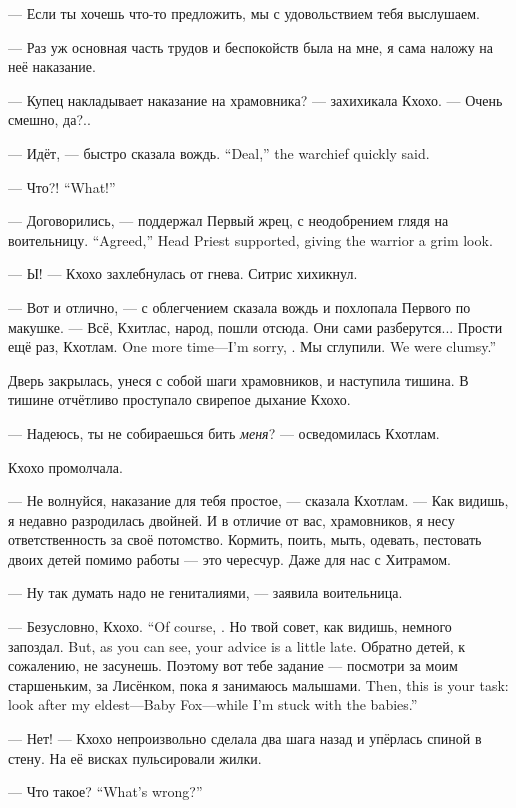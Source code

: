 --- Если ты хочешь что-то предложить, мы с удовольствием тебя выслушаем.

--- Раз уж основная часть трудов и беспокойств была на мне, я сама наложу на неё наказание.

--- Купец накладывает наказание на храмовника? --- захихикала Кхохо.
--- Очень смешно, да?..

{--- Идёт, --- быстро сказала вождь.}
{``Deal,'' the warchief quickly said.}

{--- Что?!}
{``What!''}

{--- Договорились, --- поддержал Первый жрец, с неодобрением глядя на воительницу.}
{``Agreed,'' Head Priest supported, giving the warrior a grim look.}

--- Ы! --- Кхохо захлебнулась от гнева.
Ситрис хихикнул.

--- Вот и отлично, --- с облегчением сказала вождь и похлопала Первого по макушке.
--- Всё, Кхитлас, народ, пошли отсюда.
Они сами разберутся...
{Прости ещё раз, Кхотлам.}
{One more time---I'm sorry, \Kchotlam.}
{Мы сглупили.}
{We were clumsy.''}

Дверь закрылась, унеся с собой шаги храмовников, и наступила тишина.
В тишине отчётливо проступало свирепое дыхание Кхохо.

--- Надеюсь, ты не собираешься бить \emph{меня}? --- осведомилась Кхотлам.

Кхохо промолчала.

--- Не волнуйся, наказание для тебя простое, --- сказала Кхотлам.
--- Как видишь, я недавно разродилась двойней.
И в отличие от вас, храмовников, я несу ответственность за своё потомство.
Кормить, поить, мыть, одевать, пестовать двоих детей помимо работы --- это чересчур.
Даже для нас с Хитрамом.

--- Ну так думать надо не гениталиями, --- заявила воительница.

{--- Безусловно, Кхохо.}
{``Of course, \Kchoho.}
{Но твой совет, как видишь, немного запоздал.}
{But, as you can see, your advice is a little late.}
Обратно детей, к сожалению, не засунешь.
{Поэтому вот тебе задание --- посмотри за моим старшеньким, за Лисёнком, пока я занимаюсь малышами.}
{Then, this is your task: look after my eldest---Baby Fox---while I'm stuck with the babies.''}

--- Нет! --- Кхохо непроизвольно сделала два шага назад и упёрлась спиной в стену.
На её висках пульсировали жилки.

{--- Что такое?}
{``What's wrong?''}

